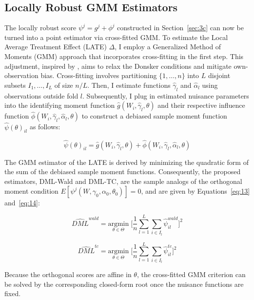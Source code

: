 \subsection{Locally Robust GMM Estimators}\label{sec:3d}
The locally robust score $\psi^j = g^j + \phi^j$ constructed in Section~\ref{sec:3c} can now be turned into a point estimator via cross-fitted GMM. To estimate the Local Average Treatment Effect (LATE) $\Delta$, I employ a Generalized Method of Moments (GMM) approach \citep{hansen1982large, newey1994large} that incorporates cross-fitting in the first step. This adjustment, inspired by \cite{DDML2018}, aims to relax the Donsker conditions and mitigate own-observation bias. Cross-fitting involves partitioning $\{1,\ldots,n\}$ into $L$ disjoint subsets $I_1,\ldots,I_L$ of size $n/L$. Then, I estimate functions $\hat{\gamma}_l$ and $\hat{\alpha}_l$ using observations outside fold $l$. Subsequently, I plug in estimated nuisance parameters into the identifying moment function $\hat{g}(W_i, \hat{\gamma}_l, \theta)$ and their respective influence function $\hat{\phi}(W_i, \hat{\gamma}_l, \hat{\alpha}_l, \theta)$  to construct a debiased sample moment function $\hat{\psi}(\theta)_{il}$ as follows:

\[
\hat{\psi}(\theta)_{il} = \hat{g}(W_i, \hat{\gamma}_l, \theta) + \hat{\phi}(W_i, \hat{\gamma}_l, \hat{\alpha}_l, \theta)
\]

The GMM estimator of the LATE is derived by minimizing the quadratic form of the sum of the debiased sample moment functions. Consequently, the proposed estimators, DML-Wald and DML-TC, are the sample analogs of the orthogonal moment condition $E[\psi^j(W, \gamma_0, \alpha_0, \theta_0)] = 0$, and are given by Equations~\ref{eq:13} and~\ref{eq:14}:


\begin{equation}\label{eq:13}
    \widehat{DML}^{wald} = \underset{\theta \in \Theta}{\text{argmin}} \; \bigg[\frac{1}{n}\sum^L_{l=1} \sum_{i\in I_l} \hat{\psi}^{wald}_{il}\bigg]^2
    \end{equation}

    \begin{equation}\label{eq:14}
    \widehat{DML}^{tc} = \underset{\theta \in \Theta}{\text{argmin}} \; \bigg[\frac{1}{n}\sum^L_{l=1} \sum_{i\in I_l} \hat{\psi}^{tc}_{il}\bigg]^2
    \end{equation}

Because the orthogonal scores are affine in $\theta$, the cross-fitted GMM criterion can be solved by the corresponding closed-form root once the nuisance functions are fixed.

